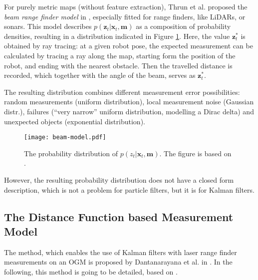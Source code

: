 For purely metric maps (without feature extraction), Thrun et al. proposed the \emph{beam range finder model}
in \cite{Thrun2005}, especially fitted for range finders, like LiDARs, or sonars.
This model describes  $p(\mathbf{\mathbf{z}}_t | \mathbf{x}_t,\mathbf{m})$ as a composition of
probability densities, resulting in a distribution indicated in Figure \ref{fig:beam-model}.
Here, the value $\mathbf{z}_t^*$ is obtained by ray tracing: at a given robot pose,
the expected measurement can be calculated by tracing a ray along the map, starting form
the position of the robot, and ending with the nearest obstacle. Then the travelled distance is recorded,
which together with the angle of the beam, serves as $\mathbf{z}_t^*$.

The resulting distribution combines different measurement error possibilities:
random measurements (uniform distribution), local measurement noise (Gaussian distr.),
failures (``very narrow'' uniform distribution, modelling a Dirac delta) and unexpected
objects (exponential distribution).
\begin{figure}[htbp]
    \centering
    \texttt{[image: beam-model.pdf]}
    \caption{The probability distribution of $p(z_t | \mathbf{x}_t,\mathbf{m})$.
        The figure is based on \cite{Thrun2005}.}
    \label{fig:beam-model}
\end{figure}

However, the resulting probability distribution does not have a closed form description, which is
not a problem for particle filters, but it is for Kalman filters.

\subsection{The Distance Function based Measurement Model}\label{subsec:dt-meas-model}
The method, which enables the use of Kalman filters with laser range finder measurements on an OGM is proposed
by Dantanarayana et al. in \cite{Dantanarayana2013,Dantanarayana2016}.
In the following, this method is going to be detailed, based on \cite{Dantanarayana2016b}.

